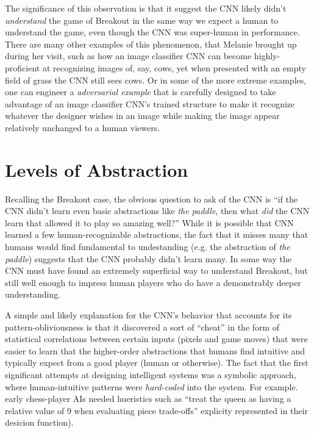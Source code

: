 \documentclass{article}
\renewcommand{\it}{\textit}
\begin{document}
The significance of this observation is that it suggest the CNN likely didn't \it{understand} the game of Breakout in the same way we expect a human to understand the game, even though the CNN was super-human in performance. There are many other examples of this phenomenon, that Melanie brought up during her visit, such as how an image classifier CNN can become highly-proficient at recognizing images of, say, cows, yet when presented with an empty field of grass the CNN still sees cows. Or in some of the more extreme examples, one can engineer a \it{adversarial example} that is carefully designed to take advantage of an image classifier CNN's trained structure to make it recognize whatever the designer wishes in an image while making the image appear relatively unchanged to a human viewers.

\section{Levels of Abstraction}

Recalling the Breakout case, the obvious question to ask of the CNN is ``if the CNN didn't learn even basic abstractions like \it{the paddle}, then what \it{did} the CNN learn that allowed it to play so amazing well?'' While it is possible that CNN learned a few human-recognizable abstractions, the fact that it misses many that humans would find fundamental to undestanding (e.g. the abstraction of \it{the paddle}) suggests that the CNN probably didn't learn many.
In some way the CNN must have found an extremely superficial way to understand Breakout, but still well enough to impress human players who do have a demonstrably deeper understanding.

A simple and likely explanation for the CNN's behavior that accounts for its pattern-obliviousness is that it discovered a sort of ``cheat'' in the form of statistical correlations between certain inputs (pixels and game moves) that were easier to learn that the higher-order abstractions that humans find intuitive and typically expect from a good player (human or otherwise).
The fact that the first significant attempts at designing intelligent systems was a symbolic approach, where human-intuitive patterns were \it{hard-coded} into the system. For example. early chess-player AIs needed hueristics such as ``treat the queen as having a relative value of 9 when evaluating piece trade-offs'' explicity represented in their desicion function).
\end{document}
